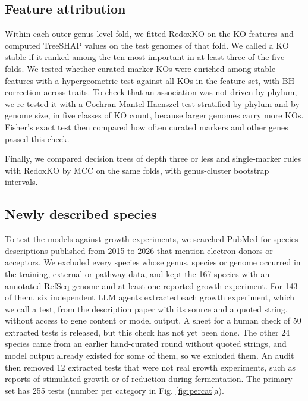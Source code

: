 \documentclass[10pt,a4paper,onecolumn]{article}
\begin{document}
\subsection{Feature attribution}\label{feature-attribution}

Within each outer genus-level fold, we fitted RedoxKO on the KO features
and computed TreeSHAP values \autocite{Lundberg2020} on the test genomes
of that fold. We called a KO stable if it ranked among the ten most
important in at least three of the five folds. We tested whether curated
marker KOs were enriched among stable features with a hypergeometric
test against all KOs in the feature set, with BH correction across
traits. To check that an association was not driven by phylum, we
re-tested it with a Cochran-Mantel-Haenszel test stratified by phylum
and by genome size, in five classes of KO count, because larger genomes
carry more KOs. Fisher's exact test then compared how often curated
markers and other genes passed this check.

Finally, we compared decision trees of depth three or less and
single-marker rules with RedoxKO by MCC on the same folds, with
genus-cluster bootstrap intervals.

\subsection{Newly described species}\label{newly-described-species}

To test the models against growth experiments, we searched PubMed for
species descriptions published from 2015 to 2026 that mention electron
donors or acceptors. We excluded every species whose genus, species or
genome occurred in the training, external or pathway data, and kept the
167 species with an annotated RefSeq genome and at least one reported
growth experiment. For 143 of them, six independent LLM agents extracted
each growth experiment, which we call a test, from the description paper
with its source and a quoted string, without access to gene content or
model output. A sheet for a human check of 50 extracted tests is
released, but this check has not yet been done. The other 24 species
came from an earlier hand-curated round without quoted strings, and
model output already existed for some of them, so we excluded them. An
audit then removed 12 extracted tests that were not real growth
experiments, such as reports of stimulated growth or of reduction during
fermentation. The primary set has 255 tests (number per category in Fig.
\ref{fig:percat}a).
\end{document}
